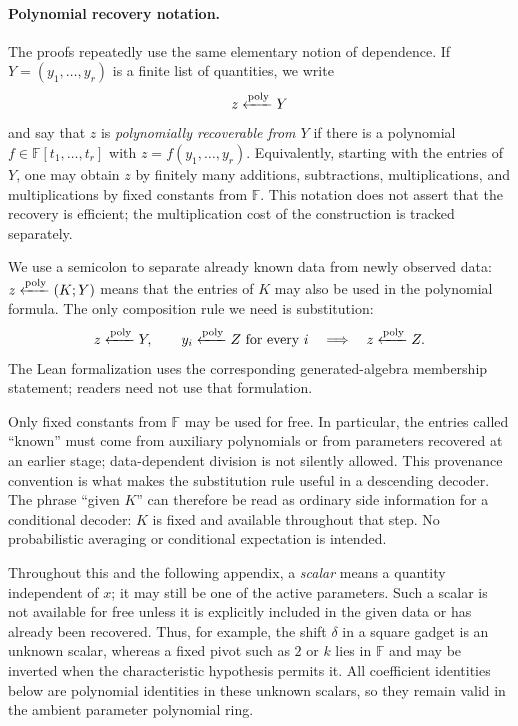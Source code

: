 \paragraph{Polynomial recovery notation.}
The proofs repeatedly use the same elementary notion of dependence.  If
$Y=(y_1,\ldots,y_r)$ is a finite list of quantities, we write
\[
    z\mathrel{\xleftarrow{\mathrm{poly}}} Y
\]
and say that $z$ is \emph{polynomially recoverable from $Y$} if there is a
polynomial $f\in\mathbb{F}[t_1,\ldots,t_r]$ with
$z=f(y_1,\ldots,y_r)$.  Equivalently, starting with the entries of $Y$, one
may obtain $z$ by finitely many additions, subtractions, multiplications, and
multiplications by fixed constants from $\mathbb{F}$.  This notation does not
assert that the recovery is efficient; the multiplication cost of the
construction is tracked separately.

We use a semicolon to separate already known data from newly observed data:
$z\mathrel{\xleftarrow{\mathrm{poly}}} (K;Y)$ means that the entries of $K$ may also be used in the
polynomial formula.  The only composition rule we need is substitution:
\[
    z\mathrel{\xleftarrow{\mathrm{poly}}} Y,\qquad
    y_i\mathrel{\xleftarrow{\mathrm{poly}}} Z\ \text{for every }i
    \quad\Longrightarrow\quad
    z\mathrel{\xleftarrow{\mathrm{poly}}} Z.
\]
The Lean formalization uses the corresponding generated-algebra membership
statement; readers need not use that formulation.

Only fixed constants from $\mathbb F$ may be used for free.  In particular,
the entries called ``known'' must come from auxiliary polynomials or from
parameters recovered at an earlier stage; data-dependent division is not
silently allowed.  This provenance convention is what makes the substitution
rule useful in a descending decoder.
The phrase ``given $K$'' can therefore be read as ordinary side information
for a conditional decoder: $K$ is fixed and available throughout that step.
No probabilistic averaging or conditional expectation is intended.

Throughout this and the following appendix, a \emph{scalar} means a quantity independent of
$x$; it may still be one of the active parameters.  Such a scalar is not
available for free unless it is explicitly included in the given data or has
already been recovered.  Thus, for example, the shift $\delta$ in a square
gadget is an unknown scalar, whereas a fixed pivot such as $2$ or $k$ lies in
$\mathbb F$ and may be inverted when the characteristic hypothesis permits
it.  All coefficient identities below are polynomial identities in these
unknown scalars, so they remain valid in the ambient parameter polynomial
ring.


